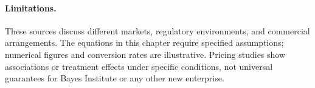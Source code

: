 \paragraph{Limitations.}
These sources discuss different markets, regulatory environments, and commercial arrangements. The equations in this chapter require specified assumptions; numerical figures and conversion rates are illustrative. Pricing studies show associations or treatment effects under specific conditions, not universal guarantees for Bayes Institute or any other new enterprise.
